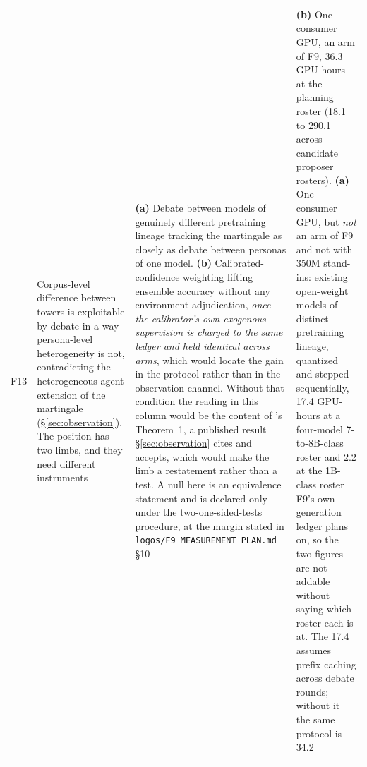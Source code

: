 \documentclass[11pt]{article}
\begin{document}
\begin{longtable}{@{}p{}p{}p{}p{}@{}}
F13 & Corpus-level difference between towers is exploitable by debate in a way persona-level heterogeneity is not, contradicting the heterogeneous-agent extension of the martingale (\S\ref{sec:observation}). The position has two limbs, and they need different instruments & \textbf{(a)} Debate between models of genuinely different pretraining lineage tracking the martingale as closely as debate between personas of one model. \textbf{(b)} Calibrated-confidence weighting lifting ensemble accuracy without any environment adjudication, \emph{once the calibrator's own exogenous supervision is charged to the same ledger and held identical across arms}, which would locate the gain in the protocol rather than in the observation channel. Without that condition the reading in this column would be the content of \cite{zhu2026debate}'s Theorem~1, a published result \S\ref{sec:observation} cites and accepts, which would make the limb a restatement rather than a test. A null here is an equivalence statement and is declared only under the two-one-sided-tests procedure, at the margin stated in \texttt{logos/}\allowbreak\texttt{F9\_MEASUREMENT\_PLAN.md} \S10 & \textbf{(b)} One consumer GPU, an arm of F9, 36.3 GPU-hours at the planning roster (18.1 to 290.1 across candidate proposer rosters). \textbf{(a)} One consumer GPU, but \emph{not} an arm of F9 and not with 350M stand-ins: existing open-weight models of distinct pretraining lineage, quantized and stepped sequentially, 17.4 GPU-hours at a four-model 7-to-8B-class roster and 2.2 at the 1B-class roster F9's own generation ledger plans on, so the two figures are not addable without saying which roster each is at. The 17.4 assumes prefix caching across debate rounds; without it the same protocol is 34.2 \\
\addlinespace

\end{longtable}
\end{document}
